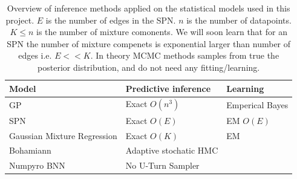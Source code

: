 \begin{table}[H]
    \centering
    \begin{tabular}{l|l|l}
    \textbf{Model} & \textbf{Predictive inference} &   \textbf{Learning} \\ \hline
    GP          & Exact $O(n^3)$  & Emperical Bayes\\
    SPN             & Exact $O(E)$ &  EM $O(E)$\\
    Gaussian Mixture Regression & Exact $O(K)$ & EM  \\
    Bohamiann                             & Adaptive stochatic HMC & \\
    Numpyro BNN                           & No U-Turn Sampler & 
    \end{tabular}
    \caption{Overview of inference methods applied on the statistical models 
            used in this project. $E$ is the number of edges in the SPN. $n$ is the number of datapoints. 
            $K \leq n$ is the number of mixture comonents. We will soon learn that for an
            SPN the number of mixture compenets is exponential larger than number of edges
            i.e. $E << K$. In theory MCMC methods samples 
            from true the posterior distribution, and do not need any fitting/learning. 
            }
\end{table}